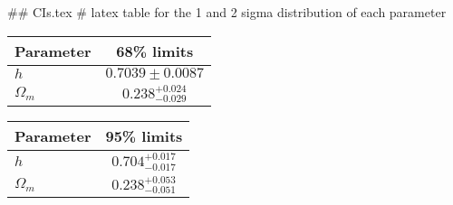 ## CIs.tex
# latex table for the 1 and 2 sigma distribution of each parameter

\begin{tabular} { l  c}
 Parameter &  68\% limits\\
\hline
{\boldmath$h              $} & $0.7039\pm 0.0087          $\\
{\boldmath$\Omega_m       $} & $0.238^{+0.024}_{-0.029}   $\\
\hline
\end{tabular}

\begin{tabular} { l  c}
 Parameter &  95\% limits\\
\hline
{\boldmath$h              $} & $0.704^{+0.017}_{-0.017}   $\\
{\boldmath$\Omega_m       $} & $0.238^{+0.053}_{-0.051}   $\\
\hline
\end{tabular}
